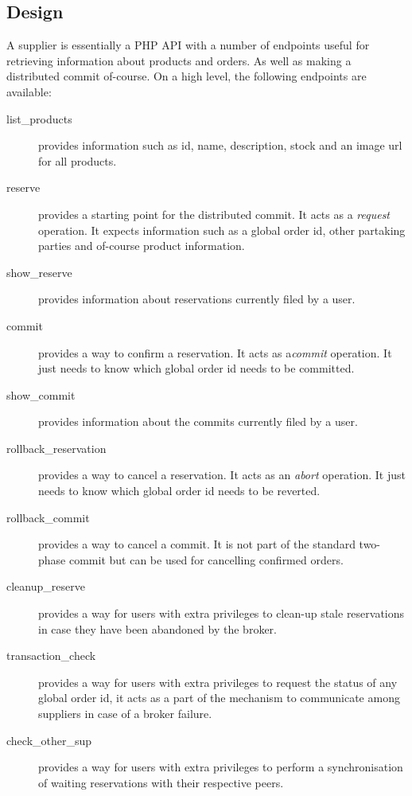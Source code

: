 \documentclass[10pt,a4paper,kul]{kulakarticle} %
\begin{document}
		\subsection{Design}\label{ch:supplier-design}
			A supplier is essentially a PHP API with a number of endpoints useful for retrieving information about products and orders. As well as making a distributed commit of-course. On a high level, the following endpoints are available:
			\begin{description}
				\item[list\_products] provides information such as id, name, description, stock and an image url for all products. 
				\item[reserve] provides a starting point for the distributed commit. It acts as a \emph{request} operation. It expects information such as a global order id, other partaking parties and of-course product information. 
				\item[show\_reserve] provides information about reservations currently filed by a user.
				\item[commit] provides a way to confirm a reservation. It acts as a\emph{commit} operation. It just needs to know which global order id needs to be committed. 
				\item[show\_commit] provides information about the commits currently filed by a user.
				\item[rollback\_reservation] provides a way to cancel a reservation. It acts as an \emph{abort} operation. It just needs to know which global order id needs to be reverted. 
				\item[rollback\_commit] provides a way to cancel a commit. It is not part of the standard two-phase commit but can be used for cancelling confirmed orders. 
				\item[cleanup\_reserve] provides a way for users with extra privileges to clean-up stale reservations in case they have been abandoned by the broker. 
				\item[transaction\_check] provides a way for users with extra privileges to request the status of any global order id, it acts as a part of the mechanism to communicate among suppliers in case of a broker failure. 
				\item[check\_other\_sup] provides a way for users with extra privileges to perform a synchronisation of waiting reservations with their respective peers.  
			\end{description}
			
\end{document}

